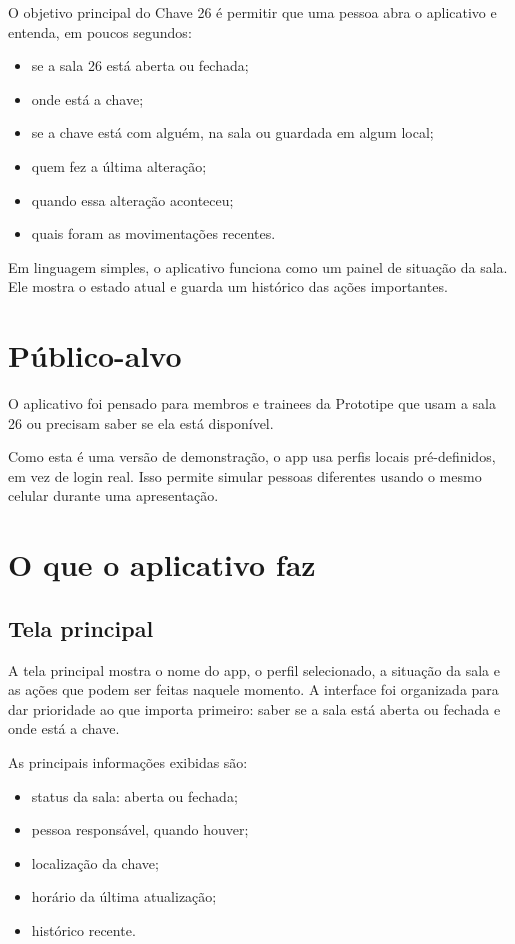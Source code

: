 \documentclass[12pt,a4paper]{article}
\begin{document}
O objetivo principal do Chave 26 é permitir que uma pessoa abra o aplicativo e entenda, em poucos segundos:

\begin{itemize}
    \item se a sala 26 está aberta ou fechada;
    \item onde está a chave;
    \item se a chave está com alguém, na sala ou guardada em algum local;
    \item quem fez a última alteração;
    \item quando essa alteração aconteceu;
    \item quais foram as movimentações recentes.
\end{itemize}

Em linguagem simples, o aplicativo funciona como um painel de situação da sala. Ele mostra o estado atual e guarda um histórico das ações importantes.

\section{Público-alvo}

O aplicativo foi pensado para membros e trainees da Prototipe que usam a sala 26 ou precisam saber se ela está disponível.

Como esta é uma versão de demonstração, o app usa perfis locais pré-definidos, em vez de login real. Isso permite simular pessoas diferentes usando o mesmo celular durante uma apresentação.

\section{O que o aplicativo faz}

\subsection{Tela principal}

A tela principal mostra o nome do app, o perfil selecionado, a situação da sala e as ações que podem ser feitas naquele momento. A interface foi organizada para dar prioridade ao que importa primeiro: saber se a sala está aberta ou fechada e onde está a chave.

As principais informações exibidas são:

\begin{itemize}
    \item status da sala: aberta ou fechada;
    \item pessoa responsável, quando houver;
    \item localização da chave;
    \item horário da última atualização;
    \item histórico recente.
\end{itemize}
\end{document}
